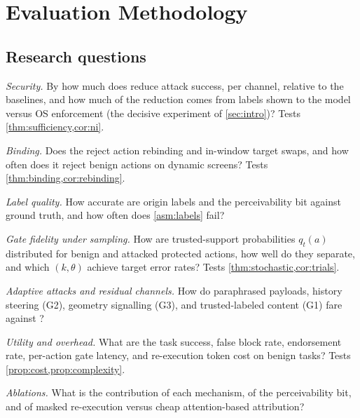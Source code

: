 \section{Evaluation Methodology}\label{sec:eval}

\begin{center}
\end{center}

\subsection{Research questions}\label{sec:rqs}

\begin{description}[leftmargin=1.2cm, style=nextline]
  \item[RQ1] \emph{Security.} By how much does \PG{} reduce attack success, per channel, relative to the baselines, and how much of the reduction comes from labels shown to the model versus OS enforcement (the decisive experiment of \cref{sec:intro})? Tests \cref{thm:sufficiency,cor:ni}.
  \item[RQ2] \emph{Binding.} Does the \DB{} reject action rebinding and in-window target swaps, and how often does it reject benign actions on dynamic screens? Tests \cref{thm:binding,cor:rebinding}.
  \item[RQ3] \emph{Label quality.} How accurate are origin labels and the perceivability bit against ground truth, and how often does \cref{asm:labels} fail?
  \item[RQ4] \emph{Gate fidelity under sampling.} How are trusted-support probabilities $q_t(a)$ distributed for benign and attacked protected actions, how well do they separate, and which $(k,\theta)$ achieve target error rates? Tests \cref{thm:stochastic,cor:trials}.
  \item[RQ5] \emph{Adaptive attacks and residual channels.} How do paraphrased payloads, history steering (G2), geometry signalling (G3), and trusted-labeled content (G1) fare against \PG{}?
  \item[RQ6] \emph{Utility and overhead.} What are the task success, false block rate, endorsement rate, per-action gate latency, and re-execution token cost on benign tasks? Tests \cref{prop:cost,prop:complexity}.
  \item[RQ7] \emph{Ablations.} What is the contribution of each mechanism, of the perceivability bit, and of masked re-execution versus cheap attention-based attribution?
\end{description}

